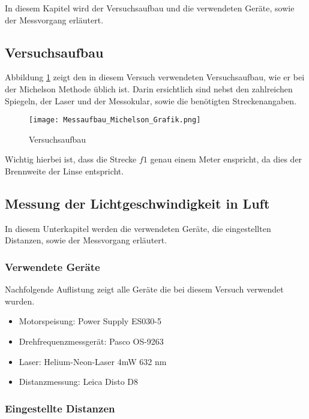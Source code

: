 In diesem Kapitel wird der Versuchsaufbau und die verwendeten Geräte, sowie der Messvorgang erläutert.

\subsection{Versuchsaufbau}

Abbildung \ref{fig:Versuchaufbau} zeigt den in diesem Versuch verwendeten Versuchsaufbau, wie er bei der Michelson Methode üblich ist. Darin ersichtlich sind nebst den zahlreichen Spiegeln, der Laser und der Messokular, sowie die benötigten Streckenangaben.

\begin{figure}[htb]
\texttt{[image: Messaufbau\_Michelson\_Grafik.png]}
\caption{Versuchsaufbau}
\label{fig:Versuchaufbau}
\end{figure}

Wichtig hierbei ist, dass die Strecke $f1$ genau einem Meter enspricht, da dies der Brennweite der Linse entspricht.

\subsection{Messung der Lichtgeschwindigkeit in Luft}

In diesem Unterkapitel werden die verwendeten Geräte, die eingestellten Distanzen, sowie der Messvorgang erläutert.

\subsubsection{Verwendete Geräte}

Nachfolgende Auflistung zeigt alle Geräte die bei diesem Versuch verwendet wurden.

\begin{itemize}
\item Motorspeisung: Power Supply ES030-5
\item Drehfrequenzmessgerät: Pasco OS-9263
\item Laser: Helium-Neon-Laser 4mW 632 nm
\item Distanzmessung: Leica Disto D8
\end{itemize}

\subsubsection{Eingestellte Distanzen}
\label{sec:Eingestellte Distanzen}

